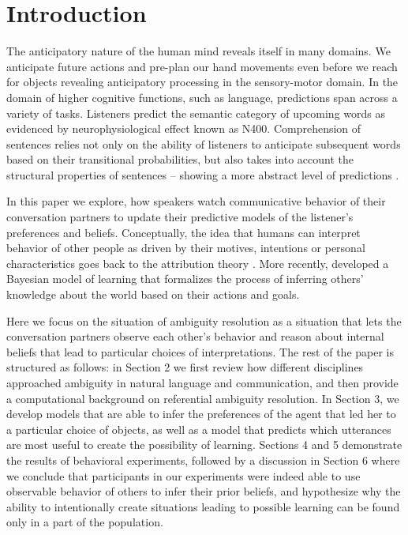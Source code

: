 \documentclass[10pt,a4paper]{article}
\begin{document}
\section{Introduction}

The anticipatory nature of the human mind reveals itself in many domains. We anticipate future actions and pre-plan our hand movements even before we reach for objects \cite{belardinelli2016s, belardinelli2018mental, lohmann2019hands} revealing anticipatory processing in the sensory-motor domain.  In the domain of higher cognitive functions, such as language, predictions span across a variety of tasks. Listeners predict the semantic category of upcoming words \cite{federmeier2002picture} as evidenced by neurophysiological effect known as N400. Comprehension of sentences relies not only on the ability of listeners to anticipate subsequent words based on their transitional probabilities, but also takes into account the structural properties of sentences -- showing a more abstract level of predictions \cite{levy2008expectation}.

In this paper we explore, how speakers watch communicative behavior of their conversation partners to update their predictive models of the listener's preferences and beliefs. Conceptually, the idea that humans can interpret behavior of other people as driven by their motives, intentions or personal characteristics goes back to the attribution theory \cite{jones1965acts, kelley1967attribution, kelley1970social}. More recently,  developed a Bayesian model of learning that formalizes the process of inferring others' knowledge about the world based on their actions and goals. 

Here we focus on the situation of ambiguity resolution as a situation that lets the conversation partners observe each other's behavior and reason about internal beliefs that lead to particular choices of interpretations. The rest of the paper is structured as follows: in Section 2 we first review how different disciplines approached ambiguity in natural language and communication, and then provide a computational background on referential ambiguity resolution. In Section 3, we develop models that are able to infer the preferences of the agent that led her to a particular choice of objects, as well as a model that predicts which utterances are most useful to create the possibility of learning. Sections 4 and 5 demonstrate the results of behavioral experiments, followed by a discussion in Section 6 where we conclude that participants in our experiments were indeed able to use observable behavior of others to infer their prior beliefs, and hypothesize why the ability to intentionally create situations leading to possible learning can be found only in a part of the population.
\end{document}
